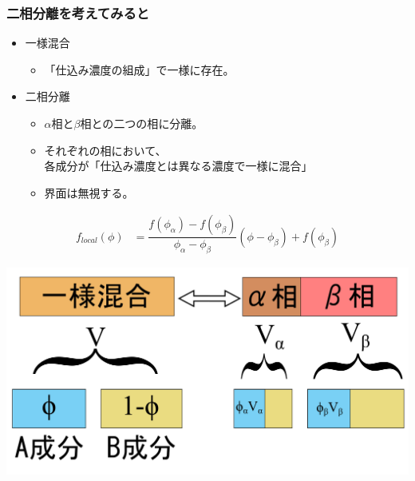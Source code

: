 \documentclass[12pt, dvipdfmx]{beamer}
\begin{document}
\begin{frame}
	\frametitle{二相分離を考えてみると}
		\begin{itemize}
		\item 一様混合
		\begin{itemize}
			\item \alert{「仕込み濃度の組成」で一様}に存在。
			\end{itemize}
		\item 二相分離
		\begin{itemize}
			 \item $\alpha$相と$\beta$相との\alert{二つの相}に分離。
			 \item それぞれの相において、\\各成分が\alert{「仕込み濃度とは異なる濃度で一様に混合」}
			 \item 界面は無視する。
		\end{itemize}
	\end{itemize}
	\begin{align*}
		f_{local}(\phi)
		&= \dfrac{f (\phi_\alpha) -f (\phi_\beta)}{\phi _\alpha -\phi _\beta} (\phi - \phi _\beta) + f (\phi_\beta)
	\end{align*}

		\centering
			\includegraphics[width=.45\textwidth]{freeEform_1.png}
	
\end{frame}
\end{document}

